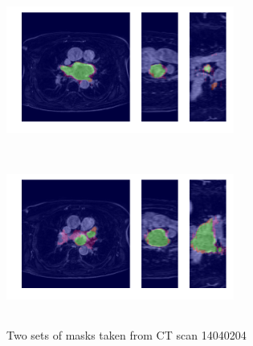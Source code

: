 \begin{figure}[H]
\centering
\label{final_model}
\begin{minipage}{0.45\textwidth}
\centering
{\includegraphics[trim=0cm 2cm 0cm 2cm, clip=true, height=50mm, width=75mm]{Appendix/img/Masks_for_14040204_0.png}}
\end{minipage}\hfill
\begin{minipage}{0.45\textwidth}
\centering
{\includegraphics[trim=0cm 2cm 0cm 2cm, clip=true, height=50mm, width=75mm]{Appendix/img/Masks_for_14040204_1.png}}
\end{minipage}
\caption{Two sets of masks taken from CT scan 14040204}
\end{figure}

